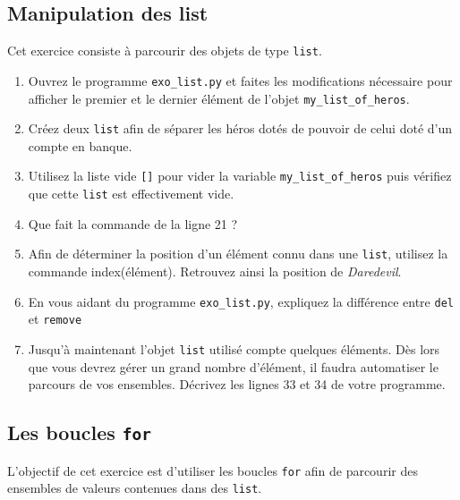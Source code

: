 \subsection{Manipulation des list}


Cet exercice consiste à parcourir des objets de type \texttt{list}.

\begin{enumerate}
\item  Ouvrez   le  programme  \texttt{exo\_list.py}  et   faites  les
  modifications  nécessaire pour  afficher  le premier  et le  dernier
  élément de l'objet \texttt{my\_list\_of\_heros}.  %
\item  Créez deux  \texttt{list} afin  de séparer  les héros  dotés de
  pouvoir de celui doté d'un compte en banque.  %
\item  Utilisez  la liste  vide  \texttt{[]}  pour vider  la  variable
  \texttt{my\_list\_of\_heros} puis  vérifiez que  cette \texttt{list}
  est effectivement vide.  %
\item Que fait la commande de la ligne 21 ?  %
\item  Afin de  déterminer la  position  d'un élément  connu dans  une
  \texttt{list}, utilisez la commande index(élément).  Retrouvez ainsi
  la position de \textit{Daredevil}.

\item En vous aidant  du programme \texttt{exo\_list.py}, expliquez la
  différence entre \texttt{del} et \texttt{remove}

\item Jusqu'à maintenant l'objet \texttt{list} utilisé compte quelques
  éléments. Dès lors que vous  devrez gérer un grand nombre d'élément,
  il faudra  automatiser le parcours  de vos ensembles.   Décrivez les
  lignes 33 et 34 de votre programme.
\end{enumerate}



\subsection{Les boucles \texttt{for}}

L'objectif  de cet  exercice est  d'utiliser les  boucles \texttt{for}
afin  de  parcourir  des  ensembles  de  valeurs  contenues  dans  des
\texttt{list}.



